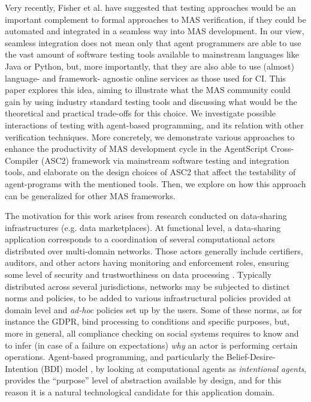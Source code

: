 Very recently, Fisher et al. \cite{Fisher2020} have suggested that testing approaches would be an important complement to formal approaches to MAS verification, if they could be automated and integrated in a seamless way into MAS development. In our view, seamless integration  does not mean only that agent programmers are able to use the vast amount of software testing tools available to mainstream languages like Java or Python, but, more importantly, that they are also able to use (almost) language- and framework- agnostic online services as those used for CI. This paper explores this idea, aiming to illustrate what the MAS community could gain by using industry standard testing tools and discussing what would be the theoretical and practical trade-offs for this choice. We investigate possible interactions of testing with agent-based programming, and its relation with other verification techniques. More concretely, we demonstrate various approaches to enhance the productivity of MAS development cycle in the  AgentScript Cross-Compiler (ASC2) framework \cite{MohajeriParizi2020}  via mainstream software testing and integration tools, and elaborate on the design choices of ASC2 that affect the testability of agent-programs with the mentioned tools. Then, we explore on how this approach can be generalized for other MAS frameworks.

The motivation for this work arises from research conducted
on data-sharing infrastructures (e.g. data marketplaces). At functional level, a data-sharing application corresponds to a coordination of several computational actors distributed over multi-domain networks. Those actors generally include certifiers, auditors, and other actors having monitoring and enforcement roles, ensuring some level of security and trustworthiness on data processing \cite{Zhou2020}.  Typically distributed across several jurisdictions, networks may be subjected to distinct norms and policies, to be added to  various infrastructural policies provided at domain level and \textit{ad-hoc} policies set up by the users. Some of these norms, as for instance the GDPR, bind  processing to conditions and specific purposes, but, more in general, all compliance checking on social systems requires to know and to infer (in case of a failure on expectations) \textit{why} an actor is performing certain operations. 
Agent-based programming, and particularly the Belief-Desire-Intention (BDI) model \cite{Rao1995}, by looking at computational agents as \textit{intentional agents}, provides the ``purpose'' level of abstraction available by design, and for this reason it is a natural technological candidate for this application domain. 


